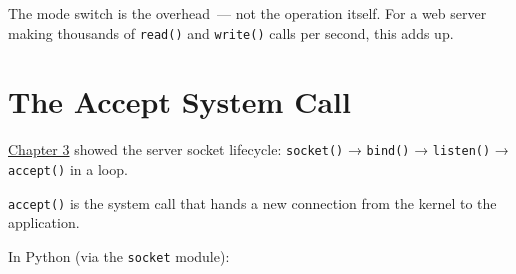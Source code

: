 \noindent{}The mode switch is the overhead~--- not the operation itself. For a web server making thousands of \texttt{read()} and \texttt{write()} calls per second, this adds up.

\setcounter{section}{1}
\section{The Accept System Call}\label{30-kernel-application-handoff:302-the-accept-system-call}

\hyperref[ch:03-network-capability]{Chapter 3} showed the server socket lifecycle: \texttt{socket()} → \texttt{bind()} → \texttt{listen()} → \texttt{accept()} in a loop.

\texttt{accept()} is the system call that hands a new connection from the kernel to the application.

\begin{codebox}[short]

\begin{Shaded}
\begin{Highlighting}[]
\OperatorTok{(}\OperatorTok{,} \OperatorTok{*}\OperatorTok{,}\OperatorTok{*}\OperatorTok{);}

\end{Highlighting}
\end{Shaded}

\end{codebox}

\noindent{}In Python (via the \texttt{socket} module):

\begin{codebox}[short]

\begin{Shaded}
\begin{Highlighting}[]
\OperatorTok{=}
\end{Highlighting}
\end{Shaded}

\end{codebox}

